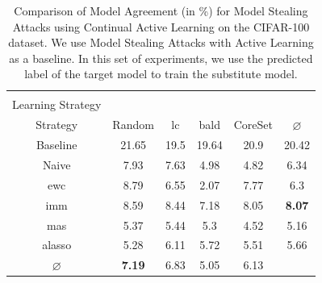 \begin{table}[h]
    \centering
    \begin{tabular}{c | c c c c | c} 
        \hline
        \diagbox[width=11em]{Active \\ Learning Strategy}{Continual Learning \\ Strategy} & Random & \gls{lc} & \gls{bald} & CoreSet & $\varnothing$\\ 
        \hline 
        Baseline & 21.65 & 19.5 & 19.64 & 20.9 & 20.42\\
        \hline
        Naive & 7.93 & 7.63 & 4.98 & 4.82 & 6.34\\
        \gls{ewc} & 8.79 & 6.55 & 2.07 & 7.77 & 6.3\\
        \gls{imm} & 8.59 & 8.44 & 7.18 & 8.05 & \textbf{8.07}\\
        \gls{mas} & 5.37 & 5.44 & 5.3 & 4.52 & 5.16\\
        \gls{alasso} & 5.28 & 6.11 & 5.72 & 5.51 & 5.66\\
        \hline
        $\varnothing$ & \textbf{7.19} & 6.83 & 5.05 & 6.13 \\
        \hline
    \end{tabular}
    \caption[Model agreement of Continual Learning strategies on CIFAR-100 using the predicted class label]{Comparison of Model Agreement (in \%) for Model Stealing Attacks using
    Continual Active Learning on the CIFAR-100 dataset. We use Model Stealing Attacks with Active Learning as a baseline. In this set of experiments,
    we use the predicted label of the target model to train the substitute model.}
    \label{fig:ModelStealingCIFAR100Label}
\end{table}


